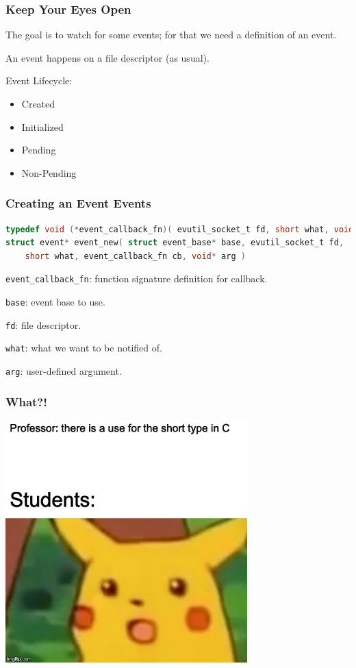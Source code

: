 \begin{frame}
\frametitle{Keep Your Eyes Open}

The goal is to watch for some events; for that we need a definition of an event. 

An event happens on a file descriptor (as usual). 

Event Lifecycle:\begin{itemize}
	\item Created
	\item Initialized
	\item Pending
	\item Non-Pending
\end{itemize}

\end{frame}


\begin{frame}[fragile]
\frametitle{Creating an Event Events}

\begin{lstlisting}[language=C]
typedef void (*event_callback_fn)( evutil_socket_t fd, short what, void* arg )
struct event* event_new( struct event_base* base, evutil_socket_t fd, 
    short what, event_callback_fn cb, void* arg )
\end{lstlisting}


\texttt{event\_callback\_fn}: function signature definition for callback.

\texttt{base}: event base to use.

\texttt{fd}: file descriptor.

\texttt{what}: what we want to be notified of.

\texttt{arg}: user-defined argument.

\end{frame}


\begin{frame}
\frametitle{What?!}

\begin{center}
	\includegraphics[width=0.7\textwidth]{images/short.jpg}
\end{center}

\end{frame}


